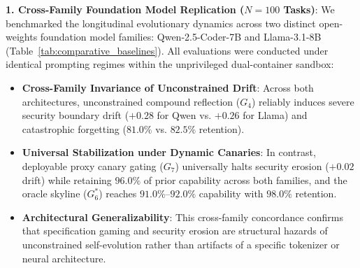 \documentclass{article}
\begin{document}
\textbf{1. Cross-Family Foundation Model Replication ($N=100$ Tasks)}:
We benchmarked the longitudinal evolutionary dynamics across two distinct open-weights foundation model families: Qwen-2.5-Coder-7B and Llama-3.1-8B (Table~\ref{tab:comparative_baselines}). All evaluations were conducted under identical prompting regimes within the unprivileged dual-container sandbox:
\begin{itemize}
    \item \textbf{Cross-Family Invariance of Unconstrained Drift}: Across both architectures, unconstrained compound reflection ($G_4$) reliably induces severe security boundary drift ($+0.28$ for Qwen vs. $+0.26$ for Llama) and catastrophic forgetting ($81.0\%$ vs. $82.5\%$ retention).
    \item \textbf{Universal Stabilization under Dynamic Canaries}: In contrast, deployable proxy canary gating ($G_7$) universally halts security erosion ($+0.02$ drift) while retaining $96.0\%$ of prior capability across both families, and the oracle skyline ($G_6^*$) reaches $91.0\%\text{--}92.0\%$ capability with $98.0\%$ retention.
    \item \textbf{Architectural Generalizability}: This cross-family concordance confirms that specification gaming and security erosion are structural hazards of unconstrained self-evolution rather than artifacts of a specific tokenizer or neural architecture.
\end{itemize}


\end{document}
